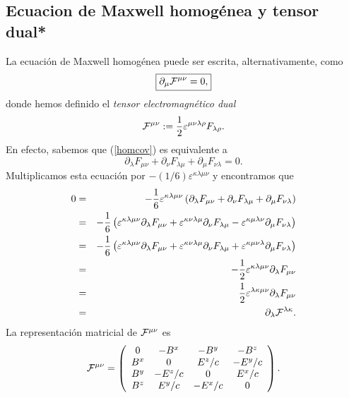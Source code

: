 \subsection{Ecuacion de Maxwell homogénea y tensor dual*}
La ecuación de Maxwell homogénea puede ser escrita, alternativamente, como
\begin{equation}
\boxed{\partial_\mu {\cal F}^{\mu\nu}=0,}
\end{equation}
donde hemos definido el \textit{tensor electromagnético dual}
\begin{equation}
{\cal F}^{\mu\nu}:=\frac{1}{2}\varepsilon^{\mu\nu\lambda\rho}F_{\lambda\rho} .
\end{equation}
En efecto, sabemos que (\ref{homcov}) es equivalente a
\begin{equation}
\partial_{\lambda}F_{\mu\nu}+\partial_{\nu}F_{\lambda\mu}+\partial_\mu 
F_{\nu\lambda}  =0.
\end{equation}
Multiplicamos esta ecuación por $-(1/6)\varepsilon^{\kappa\lambda\mu\nu}$
y encontramos que
\begin{eqnarray}
0&=&-\frac{1}{6}\varepsilon^{\kappa\lambda\mu\nu}\left(  \partial_{\lambda}%
F_{\mu\nu}+\partial_{\nu}F_{\lambda\mu}+\partial_\mu F_{\nu\lambda}\right)\\
&=&-\frac{1}{6}\left(  \varepsilon^{\kappa\lambda\mu\nu}\partial_{\lambda}%
F_{\mu\nu}+\varepsilon^{\kappa\nu\lambda\mu}\partial_{\nu}F_{\lambda\mu
}-\varepsilon^{\kappa\mu\lambda\nu}\partial_\mu F_{\nu\lambda}\right) \\
&=&-\frac{1}{6}\left(  \varepsilon^{\kappa\lambda\mu\nu}\partial_{\lambda}%
F_{\mu\nu}+\varepsilon^{\kappa\nu\lambda\mu}\partial_{\nu}F_{\lambda\mu
}+\varepsilon^{\kappa\mu\nu\lambda}\partial_\mu F_{\nu\lambda}\right) \\
&=&-\frac{1}{2}\varepsilon^{\kappa\lambda\mu\nu}\partial_{\lambda}F_{\mu\nu} \\
&=&\frac{1}{2}\varepsilon^{\lambda\kappa\mu\nu}\partial_{\lambda}F_{\mu\nu} \\
&=&\partial_{\lambda}{\cal F}^{\lambda\kappa}  .
\end{eqnarray}
La representación matricial de ${\cal F}^{\mu\nu}$ es
\begin{equation}
{\cal F}^{\mu\nu}=\left(
\begin{array}
[c]{cccc}
0 & -B^x & -B^y & -B^z\\
B^x & 0 & E^z/c & -E^y/c\\
B^y & -E^z/c & 0 & E^x/c\\
B^z & E^y/c & -E^x/c & 0
\end{array}
\right). \label{Fdualupup}
\end{equation}

